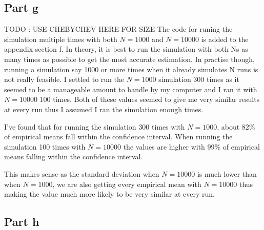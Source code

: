 \documentclass{article}
\begin{document}
\subsection*{Part g}
TODO : USE CHEBYCHEV HERE FOR SIZE
The code for runing the simulation multiple times with both $N= 1000$ and $N= 10000$
is added to the appendix section f.
In theory, it is best to run the simulation with both Ns as many times as possible to
get the most accurate estimation. In practise though, running a simulation say 1000 or more
times when it already simulates N runs is not really feasible. I settled to run the $ N = 1000$
simulation 300 times as it seemed to be a manageable amount to handle by my computer and 
I ran it with $ N = 10000$ 100 times. Both of these values seemed to give me very similar
results at every run thus I assumed I ran the simulation enough times.

I've found that for running the simulation 300 times with $N = 1000$, about 82\% of empirical means
fall within the confidence interval. When running the simulation 100 times with $N = 10000$ 
the values are higher with 99\% of empirical means falling within the confidence interval.

This makes sense as the standard deviation when $N = 10000$ is much lower than when $N = 1000$,
we are also getting every empirical mean with $ N = 10000$ thus making the value much more likely to be
very similar at every run.

\subsection*{Part h}
\end{document}
